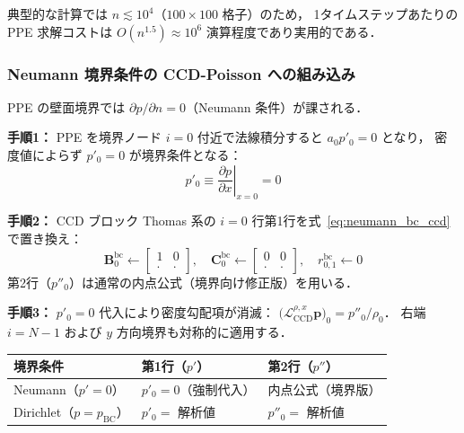 典型的な計算では $n \lesssim 10^4$（$100 \times 100$ 格子）のため，
1タイムステップあたりの PPE 求解コストは $O(n^{1.5}) \approx 10^6$ 演算程度であり実用的である．


\subsubsection{Neumann 境界条件の CCD-Poisson への組み込み}
\label{sec:ccd_neumann_bc}

PPE の壁面境界では $\partial p/\partial n = 0$（Neumann 条件）が課される．

\begin{tcolorbox}[algbox, title={Neumann 境界条件 $p'_0 = 0$ の CCD ブロック方程式への組み込み（$x$ 左端 $i=0$）}]
\textbf{手順1：} PPE を境界ノード $i=0$ 付近で法線積分すると $a_0 p'_0 = 0$ となり，
密度値によらず $p'_0 = 0$ が境界条件となる：
\begin{equation}
  p'_0 \equiv \left.\frac{\partial p}{\partial x}\right|_{x=0} = 0
  \label{eq:neumann_bc_ccd}
\end{equation}

\textbf{手順2：} CCD ブロック Thomas 系の $i=0$ 行第1行を式~\eqref{eq:neumann_bc_ccd} で置き換え：
\[
  \mathbf{B}_0^{\mathrm{bc}} \leftarrow
  \begin{bmatrix} 1 & 0 \\ \cdot & \cdot \end{bmatrix},\quad
  \mathbf{C}_0^{\mathrm{bc}} \leftarrow
  \begin{bmatrix} 0 & 0 \\ \cdot & \cdot \end{bmatrix},\quad
  r_{0,1}^{\mathrm{bc}} \leftarrow 0
\]
第2行（$p''_0$）は通常の内点公式（境界向け修正版）を用いる．

\textbf{手順3：} $p'_0 = 0$ 代入により密度勾配項が消滅：
$\bigl(\mathcal{L}_{\mathrm{CCD}}^{\rho,x}\bm{p}\bigr)_0 = p''_0/\rho_0$．
右端 $i=N-1$ および $y$ 方向境界も対称的に適用する．
\end{tcolorbox}

\begin{tcolorbox}[mybox, title={Dirichlet 境界との比較}]
\begin{center}
\PaperTableSetup
\begin{tabular}{lll}
\hline
境界条件 & 第1行（$p'$） & 第2行（$p''$） \\
\hline
Neumann（$p'=0$） & $p'_0 = 0$（強制代入） & 内点公式（境界版） \\
Dirichlet（$p=p_{\mathrm{BC}}$） & $p'_0 = $ 解析値 & $p''_0 = $ 解析値 \\
\hline
\end{tabular}
\end{center}
\end{tcolorbox}

